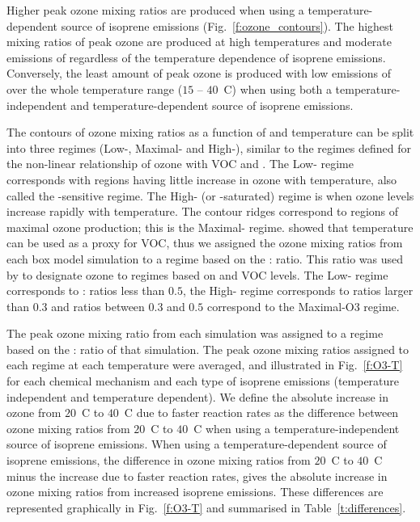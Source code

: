 Higher peak ozone mixing ratios are produced when using a temperature-dependent source of isoprene emissions (Fig.~\ref{f:ozone_contours}).
The highest mixing ratios of peak ozone are produced at high temperatures and moderate emissions of  regardless of the temperature dependence of isoprene emissions.
Conversely, the least amount of peak ozone is produced with low emissions of  over the whole temperature range ($15$ -- $40$~\degree C) when using both a temperature-independent and temperature-dependent source of isoprene emissions.

The contours of ozone mixing ratios as a function of  and temperature can be split into three  regimes (Low-, Maximal- and High-), similar to the  regimes defined for the non-linear relationship of ozone with VOC and .
The Low- regime corresponds with regions having little increase in ozone with temperature, also called the -sensitive regime.
The High- (or -saturated) regime is when ozone levels increase rapidly with temperature. 
The contour ridges correspond to regions of maximal ozone production; this is the Maximal- regime.
\citet{Pusede:2014} showed that temperature can be used as a proxy for VOC, thus we assigned the ozone mixing ratios from each box model simulation to a  regime based on the : ratio.
This ratio was used by \citet{Sillman:1995} to designate ozone to  regimes based on  and VOC levels. 
The Low- regime corresponds to : ratios less than $0.5$, the High- regime corresponds to ratios larger than $0.3$ and ratios between $0.3$ and $0.5$ correspond to the Maximal-O3 regime.

The peak ozone mixing ratio from each simulation was assigned to a  regime based on the : ratio of that simulation.
The peak ozone mixing ratios assigned to each  regime at each temperature were averaged, and illustrated in Fig.~\ref{f:O3-T} for each chemical mechanism and each type of isoprene emissions (temperature independent and temperature dependent).  
We define the absolute increase in ozone from $20$~\degree C to $40$~\degree C due to faster reaction rates as the difference between ozone mixing ratios from $20$~\degree C to $40$~\degree C when using a temperature-independent source of isoprene emissions.
When using a temperature-dependent source of isoprene emissions, the difference in ozone mixing ratios from $20$~\degree C to $40$~\degree C minus the increase due to faster reaction rates, gives the absolute increase in ozone mixing ratios from increased isoprene emissions.
These differences are represented graphically in Fig.~\ref{f:O3-T} and summarised in Table~\ref{t:differences}.

